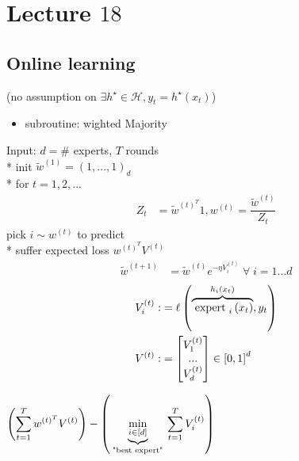 \documentclass{article}
\begin{document}
\section{Lecture $18$} 

\subsection{Online learning}
(no assumption on $\exists h^\star  \in \mathcal{H}, y_{t} = h^\star \left(x_{t}\right)$)
\begin{itemize}
\item subroutine: wighted Majority
\end{itemize}Input: $d  = \#$ experts, $T $ rounds
\\* init $\tilde{w}^{\left(1\right)} = \left(1, ..., 1\right)_{d}$
\\* for $t  = 1, 2, ...$
\begin{align*}
Z_{t} &= \tilde{w}^{\left(t\right)^{T}} 1, w^{\left(t\right)} = \dfrac{\tilde{w}^{\left(t\right)}}{Z_{t}}
\end{align*}
pick $i  \sim  w^{\left(t\right)}$ to predict
\\* suffer expected loss $w^{\left(t\right)^{T}} V^{\left(t\right)}$
\begin{align*}
\tilde{w}^{\left(t + 1\right)} &= \tilde{w}^{\left(t\right)} e^{-\eta V_{i}^{\left(t\right)}} \;\forall\; i = 1 ... d 
\end{align*}
\begin{align*}
V_{i}^{\left(t\right)} :&= \ell\left(\overbrace{\text{\;expert\;} _{i}\left(x_{t}\right)}^{h_{i}\left(x_{t}\right)} , y_{t}\right)
\\ V^{\left(t\right)} :&= \begin{bmatrix} V_{1}^{\left(t\right)} \\ ... \\ V_{d}^{\left(t\right)} \end{bmatrix} \in \left[0, 1\right]^{d}
\end{align*}
\begin{thm} \label{thm:wmj} 
$\left(\displaystyle\sum_{t=1}^{T} w^{\left(t\right)^{T}} V^{\left(t\right)}\right) - \left(\underbrace{\displaystyle\min_{i \in \left[d\right]}}_{\text{\;"best expert"\;}} \displaystyle\sum_{t=1}^{T} V_{i}^{\left(t\right)}\right)$
\newline \newline\end{thm}
\end{document}
